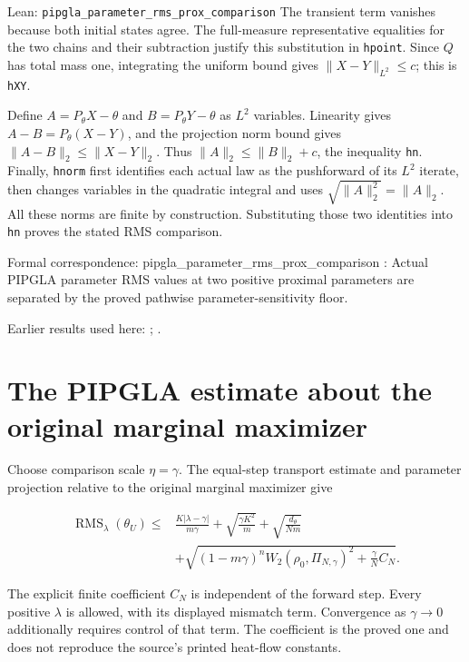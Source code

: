 \documentclass[11pt,a4paper]{article}
\begin{document}
\begin{leanbox}{Lean: \texttt{pipgla\_\allowbreak{}parameter\_\allowbreak{}rms\_\allowbreak{}prox\_\allowbreak{}comparison}}
The transient term vanishes because both initial states agree. The full-measure representative equalities for the two chains and their subtraction justify this substitution in \texttt{hpoint}. Since \(Q\) has total mass one, integrating the uniform bound gives \(\|X-Y\|_{L^2}\le c\); this is \texttt{h\allowbreak{}XY}.



Define \(A=P_\theta X-\theta\) and \(B=P_\theta Y-\theta\) as \(L^2\) variables. Linearity gives \(A-B=P_\theta(X-Y)\), and the projection norm bound gives \(\|A-B\|_2\le\|X-Y\|_2\). Thus \(\|A\|_2\le\|B\|_2+c\), the inequality \texttt{hn}. Finally, \texttt{hnorm} first identifies each actual law as the pushforward of its \(L^2\) iterate, then changes variables in the quadratic integral and uses \(\sqrt{\|A\|_2^2}=\|A\|_2\). All these norms are finite by construction. Substituting those two identities into \texttt{hn} proves the stated RMS comparison.



Formal correspondence: pipgla\_parameter\_rms\_prox\_comparison : Actual PIPGLA parameter RMS values at two positive proximal parameters are separated by the proved pathwise parameter-sensitivity floor.
\end{leanbox}


Earlier results used here: \cite[Section~3.1.1]{LangevinLean2026IPLA}; \cite[Section~3.1.6]{LangevinLean2026IPLA}.

\section{\texorpdfstring{The PIPGLA estimate about the original marginal maximizer}{The PIPGLA estimate about the original marginal maximizer}}


Choose comparison scale \(\eta=\gamma\). The equal-step transport estimate and parameter projection relative to the original marginal maximizer give

\[\begin{aligned}\operatorname{RMS}_\lambda(\theta_U)\le{}&\frac{K|\lambda-\gamma|}{m\gamma}+\sqrt{\frac{\gamma K^2}{m}}+\sqrt{\frac{d_\theta}{Nm}}\\&+\sqrt{(1-m\gamma)^nW_2(\rho_0,\Pi_{N,\gamma})^2+\frac\gamma N C_N}.\end{aligned}\]

The explicit finite coefficient \(C_N\) is independent of the forward step. Every positive \(\lambda\) is allowed, with its displayed mismatch term. Convergence as \(\gamma\to0\) additionally requires control of that term. The coefficient is the proved one and does not reproduce the source’s printed heat-flow constants.
\end{document}

